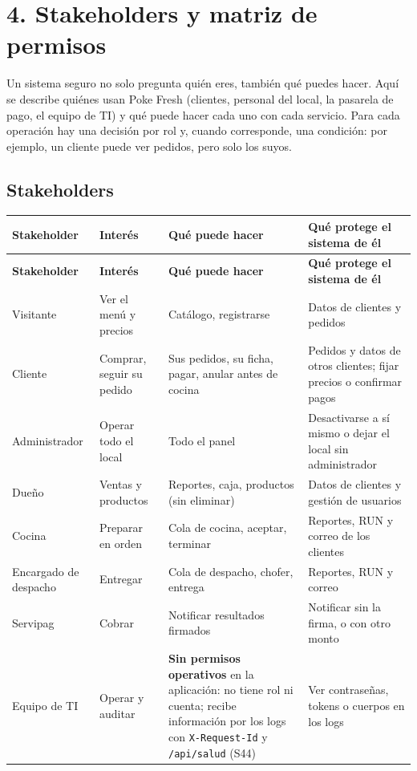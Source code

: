 
\section{4. Stakeholders y matriz de permisos}

Un sistema seguro no solo pregunta quién eres, también qué puedes hacer. Aquí se describe quiénes usan Poke Fresh (clientes, personal del local, la pasarela de pago, el equipo de TI) y qué puede hacer cada uno con cada servicio. Para cada operación hay una decisión por rol y, cuando corresponde, una condición: por ejemplo, un cliente puede ver pedidos, pero solo los suyos.


\subsection{Stakeholders}

{\small
\setlength{\tabcolsep}{3pt}\renewcommand{\arraystretch}{1.15}
\begin{longtable}{|>{\raggedright\arraybackslash}p{}|>{\raggedright\arraybackslash}p{}|>{\raggedright\arraybackslash}p{}|>{\raggedright\arraybackslash}p{}|}
\hline
\textbf{Stakeholder} & \textbf{Interés} & \textbf{Qué puede hacer} & \textbf{Qué protege el sistema de él} \\ \hline
\endfirsthead
\hline
\textbf{Stakeholder} & \textbf{Interés} & \textbf{Qué puede hacer} & \textbf{Qué protege el sistema de él} \\ \hline
\endhead
Visitante & Ver el menú y precios & Catálogo, registrarse & Datos de clientes y pedidos \\ \hline
Cliente & Comprar, seguir su pedido & Sus pedidos, su ficha, pagar, anular antes de cocina & Pedidos y datos de otros clientes; fijar precios o confirmar pagos \\ \hline
Administrador & Operar todo el local & Todo el panel & Desactivarse a sí mismo o dejar el local sin administrador \\ \hline
Dueño & Ventas y productos & Reportes, caja, productos (sin eliminar) & Datos de clientes y gestión de usuarios \\ \hline
Cocina & Preparar en orden & Cola de cocina, aceptar, terminar & Reportes, RUN y correo de los clientes \\ \hline
Encargado de despacho & Entregar & Cola de despacho, chofer, entrega & Reportes, RUN y correo \\ \hline
Servipag & Cobrar & Notificar resultados firmados & Notificar sin la firma, o con otro monto \\ \hline
Equipo de TI & Operar y auditar & \textbf{Sin permisos operativos} en la aplicación: no tiene rol ni cuenta; recibe información por los logs con \texttt{X-\allowbreak{}Request-\allowbreak{}Id} y \texttt{/\allowbreak{}api/\allowbreak{}salud} (S44) & Ver contraseñas, tokens o cuerpos en los logs \\ \hline
\end{longtable}
}

